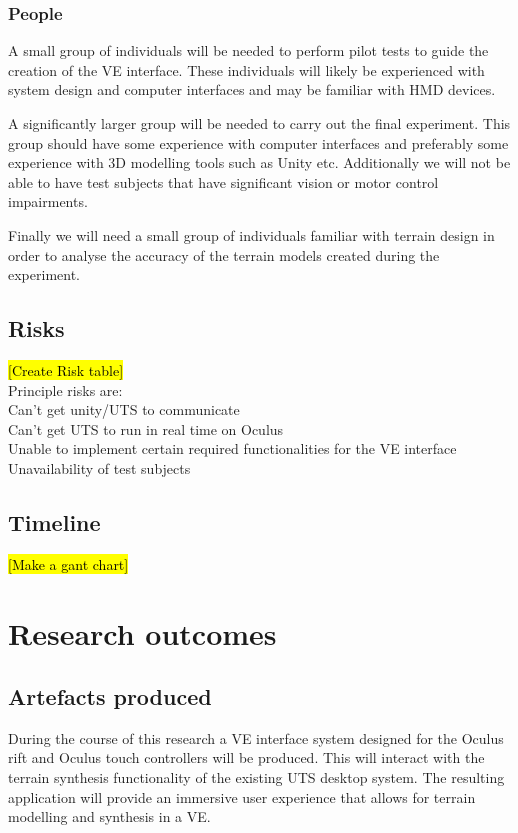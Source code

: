 \documentclass{sig-alternate-05-2015}
\begin{document}
\subsubsection{People}
A small group of individuals will be needed to perform pilot tests to guide the creation of the VE interface. These individuals will likely be experienced with system design and computer interfaces and may be familiar with HMD devices.

A significantly larger group will be needed to carry out the final experiment. This group should have some experience with computer interfaces and preferably some experience with 3D modelling tools such as Unity etc. Additionally we will not be able to have test subjects that have significant vision or motor control impairments.

Finally we will need a small group of individuals familiar with terrain design in order to analyse the accuracy of the terrain models created during the experiment. 
\subsection{Risks}
\hl{[Create Risk table]}\\ Principle risks are:\\
Can't get unity/UTS to communicate\\
Can't get UTS to run in real time on Oculus\\
Unable to implement certain required functionalities for the VE interface\\
Unavailability of test subjects
\subsection{Timeline}
\hl{[Make a gant chart]}
\section{Research outcomes}
\subsection{Artefacts produced}
During the course of this research a VE interface system designed for the Oculus rift and Oculus touch controllers will be produced. This will interact with the terrain synthesis functionality of the existing UTS desktop system\cite{Gain2015}. The resulting application will provide an immersive user experience that allows for terrain modelling and synthesis in a VE.
\end{document}
